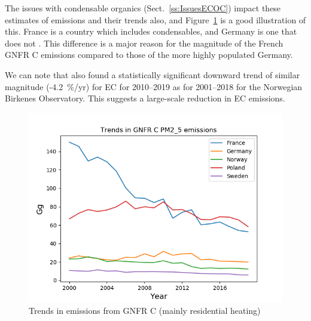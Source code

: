 The issues with condensable organics (Sect.~\ref{ss:IssuesECOC}) impact these estimates of \pmfine emissions and their trends also, and Figure~\ref{fig:gnfrCtrends} is a good illustration of this. France is a country which includes condensables, and Germany is one that does not \citep{CONDws2020}. This difference is a major reason for the magnitude of the French GNFR C emissions compared to those of the more highly populated Germany. 



We can note that \citet{Yttri2021} also found a statistically significant downward trend of similar magnitude
(-4.2~\%/yr)  for EC for 2010--2019 as for 2001--2018
for the Norwegian Birkenes Observatory. This suggests a large-scale reduction in EC emissions.


\begin{figure}
    \centering
    \includegraphics[width=12cm,trim=0 0 0 1.5cm,clip]{FIGS_TRENDS/PlotEmisTrends_PM2_5.png}
    \caption{Trends in \pmfine emissions from GNFR C (mainly residential heating)}
    \label{fig:gnfrCtrends}
\end{figure}


